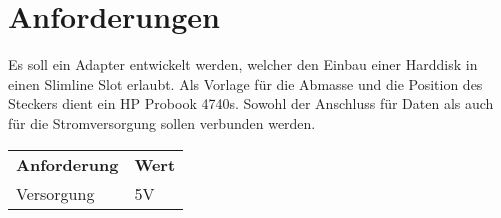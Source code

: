 
\section{Anforderungen}
Es soll ein Adapter entwickelt werden, welcher den Einbau einer Harddisk in 
einen Slimline Slot erlaubt. Als Vorlage für die Abmasse und die Position 
des Steckers dient ein HP Probook 4740s. Sowohl der Anschluss für Daten als 
auch für die Stromversorgung sollen verbunden werden. 

\begin{table}[h!]
  \begin{tabular}{@{}ll}
    \textbf{Anforderung}        & \textbf{Wert} \\
    Versorgung                  & 5V \\
  \end{tabular}
\end{table}

